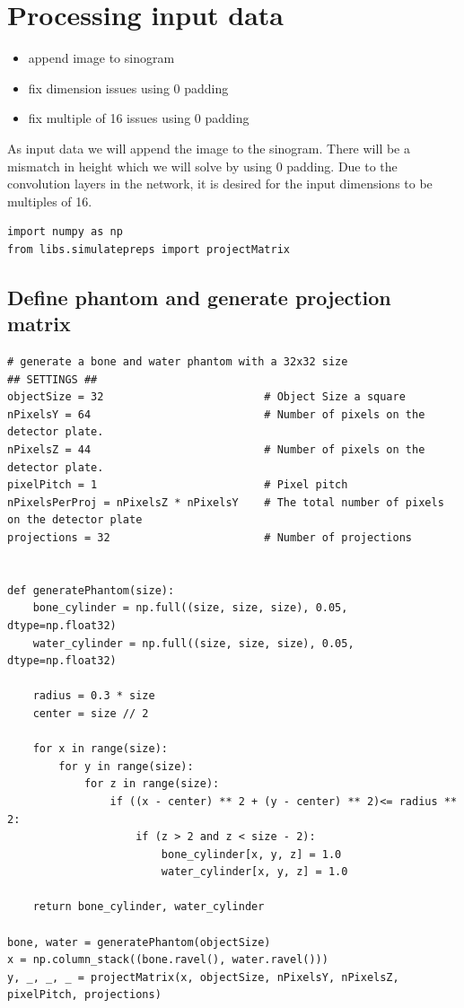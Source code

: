 \section{Processing input data}

\begin{itemize}
\item append image to sinogram
\item fix dimension issues using 0 padding
\item fix multiple of 16 issues using 0 padding
\end{itemize}

As input data we will append the image to the sinogram. There will be a mismatch in height which we will solve by using 0 padding.
Due to the convolution layers in the network, it is desired for the input dimensions to be multiples of 16.

\begin{verbatim}
import numpy as np
from libs.simulatepreps import projectMatrix
\end{verbatim}

\subsection{Define phantom and generate projection matrix}

\begin{verbatim}
# generate a bone and water phantom with a 32x32 size
## SETTINGS ##
objectSize = 32                         # Object Size a square
nPixelsY = 64                           # Number of pixels on the detector plate.
nPixelsZ = 44                           # Number of pixels on the detector plate.
pixelPitch = 1                          # Pixel pitch
nPixelsPerProj = nPixelsZ * nPixelsY    # The total number of pixels on the detector plate
projections = 32                        # Number of projections


def generatePhantom(size):
    bone_cylinder = np.full((size, size, size), 0.05, dtype=np.float32)
    water_cylinder = np.full((size, size, size), 0.05, dtype=np.float32)

    radius = 0.3 * size
    center = size // 2

    for x in range(size):
        for y in range(size):
            for z in range(size):
                if ((x - center) ** 2 + (y - center) ** 2)<= radius ** 2:
                    if (z > 2 and z < size - 2):
                        bone_cylinder[x, y, z] = 1.0
                        water_cylinder[x, y, z] = 1.0

    return bone_cylinder, water_cylinder

bone, water = generatePhantom(objectSize)
x = np.column_stack((bone.ravel(), water.ravel()))
y, _, _, _ = projectMatrix(x, objectSize, nPixelsY, nPixelsZ, pixelPitch, projections)
\end{verbatim}

